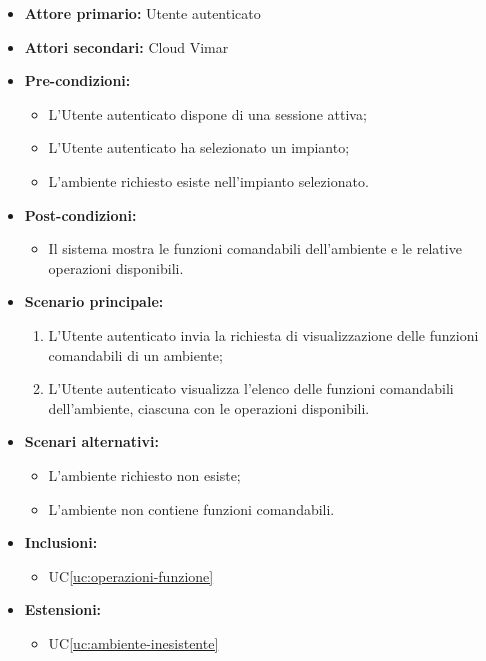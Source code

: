 \documentclass[11pt, a4paper]{article}
\newcounter{uc}                            %
\newcommand{\ucref}[1]{UC\ref{uc:#1}}
\begin{document}
\begin{itemize}[label=\textbullet]
  \item \textbf{Attore primario:} Utente autenticato
  \item \textbf{Attori secondari:} Cloud Vimar
  \item \textbf{Pre-condizioni:}
  \begin{itemize}[label=‣]
    \item L'Utente autenticato dispone di una sessione attiva;
    \item L'Utente autenticato ha selezionato un impianto;
    \item L'ambiente richiesto esiste nell'impianto selezionato.
  \end{itemize}
  \item \textbf{Post-condizioni:}
  \begin{itemize}[label=‣]
    \item Il sistema mostra le funzioni comandabili dell'ambiente e le relative operazioni disponibili.
  \end{itemize}
  \item \textbf{Scenario principale:}
  \begin{enumerate}
    \item L'Utente autenticato invia la richiesta di visualizzazione delle funzioni comandabili di un ambiente;
    \item L'Utente autenticato visualizza l'elenco delle funzioni comandabili dell'ambiente, ciascuna con le operazioni disponibili.
  \end{enumerate}
  \item \textbf{Scenari alternativi:}
  \begin{itemize}[label=‣]
    \item L'ambiente richiesto non esiste;
    \item L'ambiente non contiene funzioni comandabili.
  \end{itemize}
  \item \textbf{Inclusioni:}
  \begin{itemize}[label=‣]
    \item \ucref{operazioni-funzione}
  \end{itemize}
  \item \textbf{Estensioni:}
  \begin{itemize}[label=‣]
    \item \ucref{ambiente-inesistente}
  \end{itemize}
\end{itemize}
\end{document}
